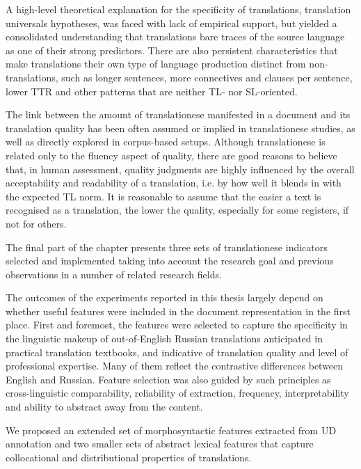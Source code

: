 A high-level theoretical explanation for the specificity of translations, translation universals hypotheses, was faced with lack of empirical support, but yielded a consolidated understanding that translations bare traces of the source language as one of their strong predictors. There are also persistent characteristics that make translations their own type of language production distinct from non-translations, such as longer sentences, more connectives and clauses per sentence, lower TTR and other patterns that are neither TL- nor SL-oriented.

The link between the amount of translationese manifested in a document and its translation quality has been often assumed or implied in translationese studies, as well as directly explored in corpus-based setups. Although translationese is related only to the fluency aspect of quality, there are good reasons to believe that, in human assessment, quality judgments are highly influenced by the overall acceptability and readability of a translation, i.e. by how well it blends in with the expected TL norm. 
It is reasonable to assume that the easier a text is recognised as a translation, the lower the quality, especially for some registers, if not for others. 

The final part of the chapter presents three sets of translationese indicators selected and implemented taking into account the research goal and previous observations in a number of related research fields.  

The outcomes of the experiments reported in this thesis largely depend on whether useful features were included in the document representation in the first place. 
First and foremost, the features were selected to capture the specificity in the linguistic makeup of out-of-English Russian translations anticipated in practical translation textbooks, and indicative of translation quality and level of professional expertise. Many of them reflect the contrastive differences between English and Russian. Feature selection was also guided by such principles as cross-linguistic comparability, reliability of extraction, frequency, interpretability and ability to abstract away from the content.

We proposed an extended set of morphosyntactic features extracted from UD annotation and two smaller sets of abstract lexical features that capture collocational and distributional properties of translations. 

